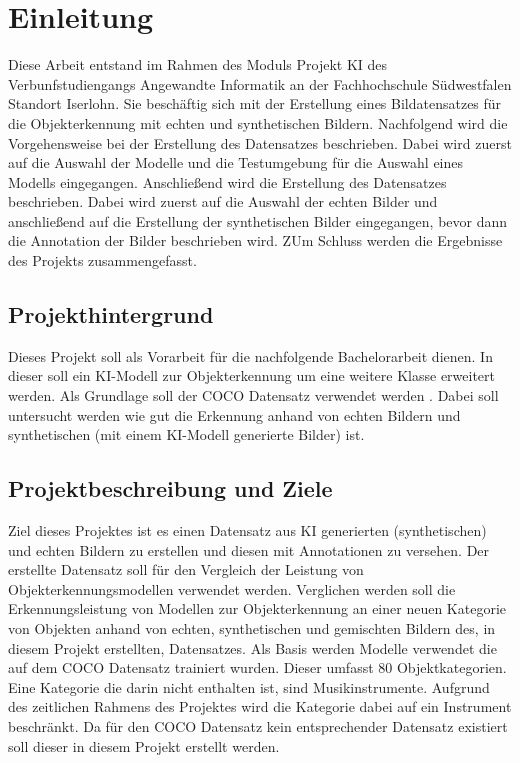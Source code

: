 \section{Einleitung}
Diese Arbeit entstand im Rahmen des Moduls Projekt KI des Verbunfstudiengangs Angewandte Informatik an der Fachhochschule Südwestfalen Standort Iserlohn. Sie beschäftig sich mit der Erstellung eines Bildatensatzes für die Objekterkennung mit echten und synthetischen Bildern. Nachfolgend wird die Vorgehensweise bei der Erstellung des Datensatzes beschrieben. Dabei wird zuerst auf die Auswahl der Modelle und die Testumgebung für die Auswahl eines Modells eingegangen. Anschließend wird die Erstellung des Datensatzes beschrieben. Dabei wird zuerst auf die Auswahl der echten Bilder und anschließend auf die Erstellung der synthetischen Bilder eingegangen, bevor dann die Annotation der Bilder beschrieben wird. ZUm Schluss werden die Ergebnisse des Projekts zusammengefasst.

\subsection{Projekthintergrund}
Dieses Projekt soll als Vorarbeit für die nachfolgende Bachelorarbeit dienen. In dieser soll ein KI-Modell zur Objekterkennung um eine weitere Klasse erweitert werden. Als Grundlage soll der COCO Datensatz verwendet werden \cite{coco2015}. Dabei soll untersucht werden wie gut die Erkennung anhand von echten Bildern und synthetischen (mit einem KI-Modell generierte Bilder) ist.

\subsection{Projektbeschreibung und Ziele}
Ziel dieses Projektes ist es einen Datensatz aus KI generierten (synthetischen) und echten Bildern zu erstellen und diesen mit Annotationen zu versehen. Der erstellte Datensatz soll für den Vergleich der Leistung von Objekterkennungsmodellen verwendet werden. Verglichen werden soll die Erkennungsleistung von Modellen zur Objekterkennung an einer neuen Kategorie von Objekten anhand von echten, synthetischen und gemischten Bildern des, in diesem Projekt erstellten, Datensatzes. Als Basis werden Modelle verwendet die auf dem COCO Datensatz \cite{coco2015} trainiert wurden. Dieser umfasst 80 Objektkategorien. Eine Kategorie die darin nicht enthalten ist, sind Musikinstrumente. Aufgrund des zeitlichen Rahmens des Projektes wird die Kategorie dabei auf ein Instrument beschränkt. Da für den COCO Datensatz kein entsprechender Datensatz existiert soll dieser in diesem Projekt erstellt werden.

